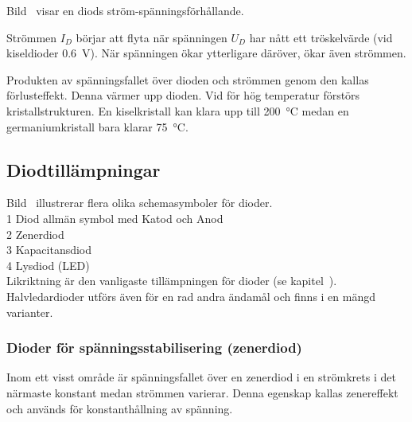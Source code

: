 Bild~ visar en diods ström-spänningsförhållande.

Strömmen \(I_D\) börjar att flyta när spänningen \(U_D\) har nått ett
tröskelvärde (vid kiseldioder \qty{0,6}{\volt}).
När spänningen ökar ytterligare däröver, ökar även strömmen.

Produkten av spänningsfallet över dioden och strömmen genom den kallas
förlusteffekt. Denna värmer upp dioden. Vid för hög temperatur förstörs
kristallstrukturen.
En kiselkristall kan klara upp till \qty{200}{\degreeCelsius} medan en
germaniumkristall bara klarar \qty{75}{\degreeCelsius}.\\


\newpage
\subsection{Diodtillämpningar}

Bild~ illustrerar flera olika schemasymboler för dioder.\\
1 Diod allmän symbol med Katod och Anod\\
2 Zenerdiod\\
3 Kapacitansdiod\\
4 Lysdiod (LED)\\

Likriktning är den vanligaste tillämpningen för dioder (se
kapitel~).
Halvledardioder utförs även för en rad andra ändamål och finns i en mängd
varianter.

\subsubsection{Dioder för spänningsstabilisering (zenerdiod)}
\label{diod_zener}

Inom ett visst område är spänningsfallet över en zenerdiod i en strömkrets i det
närmaste konstant medan strömmen varierar.
Denna egenskap kallas zenereffekt och används för konstanthållning av spänning.


